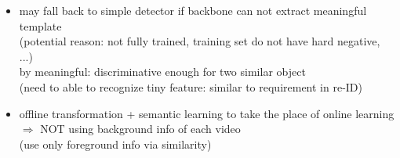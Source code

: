 \begin{itemize}
\begin{itemize}
\begin{itemize}
		\item may fall back to simple detector if backbone can not extract meaningful template \\
		(potential reason: not fully trained, training set do not have hard negative, ...) \\ 
		by meaningful: discriminative enough for two similar object \\
		(need to able to recognize tiny feature: similar to requirement in re-ID)
		\item offline transformation + semantic learning to take the place of online learning \\
		$\Rightarrow$ NOT using background info of each video \\
		(use only foreground info via similarity)
		\end{itemize}
	\end{itemize}


\end{itemize}
